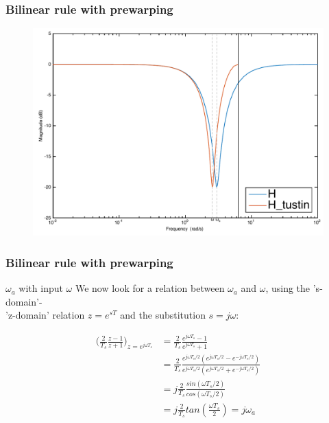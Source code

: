\begin{frame}
	\frametitle{Bilinear rule with prewarping}
	\vspace{-0.5em}
	\begin{figure}
		\centering
		\includegraphics[width=0.85\linewidth]{Distortion_bode}
	\end{figure}
\end{frame}

\begin{frame}
	\frametitle{Bilinear rule with prewarping}
	\begin{block}{$\omega_a$ with input $\omega$}
		We now look for a relation between $\omega_a$ and $\omega$, using the 's-domain'-\\'z-domain' relation $z = e^{sT}$ and the substitution $s=j\omega$:
		\vspace{-2em} 
		\begin{center}
			\begin{align*}
			\big(\frac{2}{T_s} \frac{z-1}{z+1}\big)_{z = e^{j\omega T_s}} &=\frac{2}{T_s} \frac{e^{j\omega T_s}-1}{e^{j\omega T_s}+1}\\
			&= \frac{2}{T_s} \frac{e^{j\omega T_s/2} (e^{j\omega T_s/2} - e^{-j\omega T_s/2})}{e^{j\omega T_s/2}(e^{j\omega T_s/2} + e^{-j\omega T_s/2})}\\
			&= j \frac{2}{T_s} \frac{sin(\omega T_s/2)}{cos(\omega T_s/2)}\\
			&= j \frac{2}{T_s} tan(\frac{\omega T_s}{2}) = j\omega_a
			\end{align*}
		\end{center}
	\end{block}
\end{frame}


